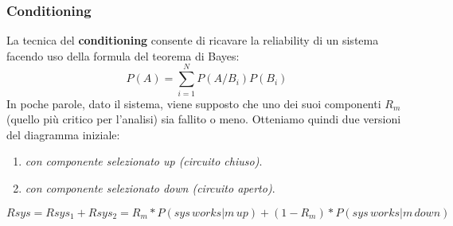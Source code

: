 \subsubsection{Conditioning}
La tecnica del \textbf{conditioning} consente di ricavare la reliability di un sistema facendo uso della formula del teorema di Bayes:
\begin{equation*}
	P(A) = \sum_{i = 1}^{N}P(A/B_i)P(B_i)
\end{equation*}
In poche parole, dato il sistema, viene supposto che uno dei suoi componenti $R_m$ (quello più critico per l'analisi) sia fallito o meno. Otteniamo quindi due versioni del diagramma iniziale:
\begin{enumerate}
	\item \textit{con componente selezionato up (circuito chiuso)}.
	\item \textit{con componente selezionato down (circuito aperto)}.
\end{enumerate}
\begin{equation*}
	Rsys = Rsys_1 + Rsys_2 = R_m*P(sys\,works|m\,up) + (1 - R_m)*P(sys\,works|m\,down)
\end{equation*}
